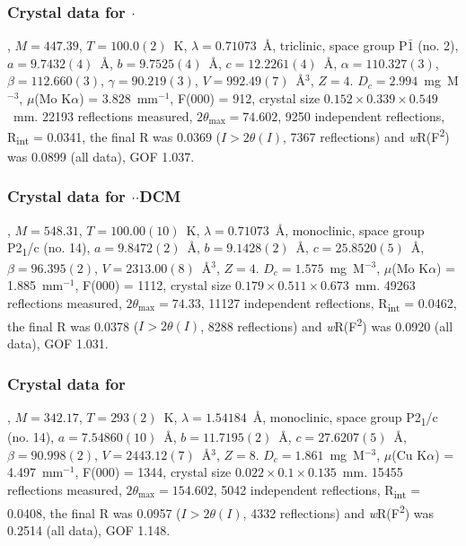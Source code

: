 \begin{refsection}
\subsubsection{Crystal data for \texorpdfstring{$\cdot$}{C23 H20 N4 O Se}}
, $M=447.39$, $T=100.0(2)$~K, $\lambda=0.71073$~\AA, triclinic, space group P$\bar{1}$ (no. 2), $a = 9.7432(4)$~\AA, $b = 9.7525(4)$~\AA, $c = 12.2261(4)$~\AA, $\alpha = 110.327(3)$\degree, $\beta = 112.660(3)$\degree, $\gamma = 90.219(3)$\degree, $V = 992.49(7)$~\AA$^{3}$, $Z = 4$. $D_{c}= 2.994$~mg~M$^{-3}$, $\mu$(Mo K$\alpha$) = 3.828~mm$^{-1}$, F(000) = 912, crystal size $0.152 \times 0.339 \times 0.549$~mm. 22193 reflections measured, $2\theta_{\mathrm{max}}=74.602$\degree, 9250 independent reflections, R\textsubscript{int} = 0.0341, the final R was 0.0369 ($I > 2\theta(I)$, 7367 reflections) and \emph{w}R(F\textsuperscript{2}) was 0.0899 (all data), GOF 1.037.

\subsubsection{Crystal data for \texorpdfstring{$\cdot$$\cdot$DCM}{C24 H22 Cl2 N4 O2 Se}}
, $M=548.31$, $T=100.00(10)$~K, $\lambda=0.71073$~\AA, monoclinic, space group P2\textsubscript{1}/c (no. 14), $a = 9.8472(2)$~\AA, $b = 9.1428(2)$~\AA, $c = 25.8520(5)$~\AA, $\beta = 96.395(2)$\degree, $V = 2313.00(8)$~\AA$^{3}$, $Z = 4$. $D_{c}= 1.575$~mg~M$^{-3}$, $\mu$(Mo K$\alpha$) = 1.885~mm$^{-1}$, F(000) = 1112, crystal size $0.179 \times 0.511 \times 0.673$~mm. 49263 reflections measured, $2\theta_{\mathrm{max}}=74.33$\degree, 11127 independent reflections, R\textsubscript{int} = 0.0462, the final R was 0.0378 ($I > 2\theta(I)$, 8288 reflections) and \emph{w}R(F\textsuperscript{2}) was 0.0920 (all data), GOF 1.031.

\subsubsection{Crystal data for \texorpdfstring{}{C14 H8 F3 N O Se}}
, $M=342.17$, $T=293(2)$~K, $\lambda=1.54184$~\AA, monoclinic, space group P2\textsubscript{1}/c (no. 14), $a = 7.54860(10)$~\AA, $b = 11.7195(2)$~\AA, $c = 27.6207(5)$~\AA, $\beta = 90.998(2)$\degree, $V = 2443.12(7)$~\AA$^{3}$, $Z = 8$. $D_{c}= 1.861$~mg~M$^{-3}$, $\mu$(Cu K$\alpha$) = 4.497~mm$^{-1}$, F(000) = 1344, crystal size $0.022 \times 0.1 \times 0.135$~mm. 15455 reflections measured, $2\theta_{\mathrm{max}}=154.602$\degree, 5042 independent reflections, R\textsubscript{int} = 0.0408, the final R was 0.0957 ($I > 2\theta(I)$, 4332 reflections) and \emph{w}R(F\textsuperscript{2}) was 0.2514 (all data), GOF 1.148.


\end{refsection}

